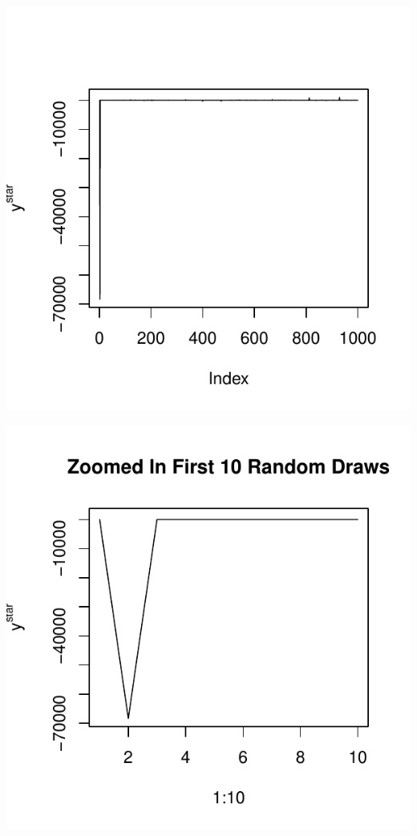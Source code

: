 \documentclass{article}\usepackage[]{graphicx}\usepackage[]{color}
\makeatletter
\def\maxwidth{ %
  \ifdim\Gin@nat@width>\linewidth
    \linewidth
  \else
    \Gin@nat@width
  \fi
}
\newenvironment{knitrout}{}{} %
\makeatother
\begin{document}
\begin{enumerate}
\begin{enumerate}
\begin{knitrout}
{}




{\centering \includegraphics[width=\maxwidth]{figure/prob5c-3} 

}




{\centering \includegraphics[width=\maxwidth]{figure/prob5c-4} 

}
\end{knitrout}
\end{enumerate}
\end{enumerate}
\end{document}
